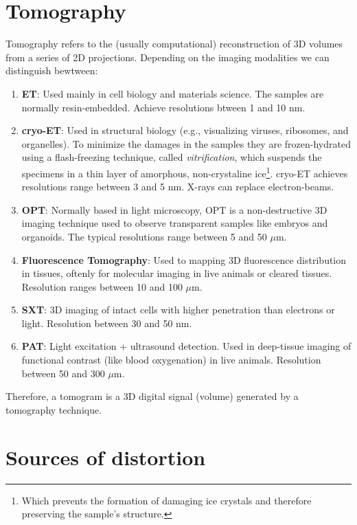 
\section{Tomography}

Tomography refers to the (usually computational) reconstruction of 3D
volumes from a series of 2D projections. Depending on the imaging
modalities we can distinguish bewtween:
\begin{enumerate}
\item \textbf{\gls{ET}}: Used mainly in cell biology and materials
  science. The samples are normally resin-embedded. Achieve resolutions
  btween 1 and 10 nm.
\item \textbf{\gls{cryo-ET}}: Used in structural biology (e.g.,
  visualizing viruses, ribosomes, and organelles). To minimize the
  damages in the samples they are frozen-hydrated using a
  flash-freezing technique, called \emph{vitrification}, which
  suspends the specimens in a thin layer of amorphous, non-crystaline
  ice\footnote{Which prevents the formation of damaging ice crystals
  and therefore preserving the sample's structure.}. \gls{cryo-ET} achieves
  resolutions range between 3 and 5 nm. X-rays can replace
  electron-beams.
\item \textbf{\gls{OPT}}: Normally based in light microscopy,
  \gls{OPT} is a non-destructive 3D imaging technique used to observe
  transparent samples like embryos and organoids. The typical
  resolutions range between 5 and 50 $\mu$m.
\item \textbf{Fluorescence Tomography}: Used to mapping 3D
  fluorescence distribution in tissues, oftenly for molecular imaging
  in live animals or cleared tissues. Resolution ranges between 10 and
  100 $\mu$m.
\item \textbf{\gls{SXT}}: 3D imaging of intact cells with
  higher penetration than electrons or light. Resolution between 30
  and 50 nm.
\item \textbf{\gls{PAT}}: Light excitation + ultrasound
  detection. Used in deep-tissue imaging of functional contrast (like
  blood oxygenation) in live animals. Resolution between 50 and 300
  $\mu$m.
\end{enumerate}

Therefore, a tomogram is a 3D digital signal (volume) generated by a
tomography technique.


\section{Sources of distortion}

